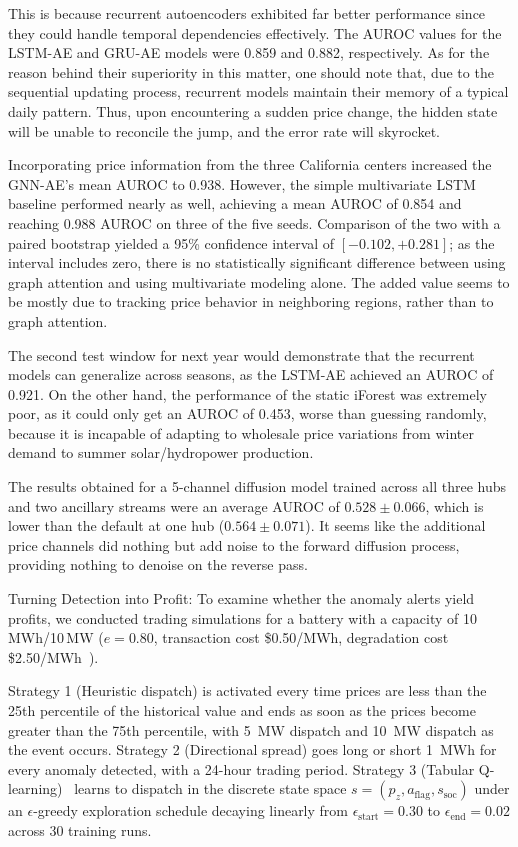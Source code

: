 \documentclass[journal]{IEEEtran}
\begin{document}
This is because recurrent autoencoders exhibited far better performance since they could handle temporal dependencies effectively. The AUROC values for the LSTM-AE and GRU-AE models were 0.859 and 0.882, respectively. As for the reason behind their superiority in this matter, one should note that, due to the sequential updating process, recurrent models maintain their memory of a typical daily pattern. Thus, upon encountering a sudden price change, the hidden state will be unable to reconcile the jump, and the error rate will skyrocket.

Incorporating price information from the three California centers increased the GNN-AE's mean AUROC to 0.938. However, the simple multivariate LSTM baseline performed nearly as well, achieving a mean AUROC of 0.854 and reaching 0.988 AUROC on three of the five seeds. Comparison of the two with a paired bootstrap yielded a 95\% confidence interval of $[-0.102, +0.281]$; as the interval includes zero, there is no statistically significant difference between using graph attention and using multivariate modeling alone. The added value seems to be mostly due to tracking price behavior in neighboring regions, rather than to graph attention.

The second test window for next year would demonstrate that the recurrent models can generalize across seasons, as the LSTM-AE achieved an AUROC of 0.921. On the other hand, the performance of the static iForest was extremely poor, as it could only get an AUROC of 0.453, worse than guessing randomly, because it is incapable of adapting to wholesale price variations from winter demand to summer solar/hydropower production.

The results obtained for a 5-channel diffusion model trained across all three hubs and two ancillary streams were an average AUROC of $0.528\pm0.066$, which is lower than the default at one hub ($0.564\pm0.071$). It seems like the additional price channels did nothing but add noise to the forward diffusion process, providing nothing to denoise on the reverse pass.

Turning Detection into Profit: To examine whether the anomaly alerts yield profits, we conducted trading simulations for a battery with a capacity of 10\,MWh/10\,MW ($e=0.80$, transaction cost \$0.50/MWh, degradation cost \$2.50/MWh~\cite{Xu_BESS_Degradation}).

Strategy 1 (Heuristic dispatch) is activated every time prices are less than the 25th percentile of the historical value and ends as soon as the prices become greater than the 75th percentile, with 5\, MW dispatch and 10\, MW dispatch as the event occurs. Strategy 2 (Directional spread) goes long or short 1\, MWh for every anomaly detected, with a 24-hour trading period. Strategy 3 (Tabular Q-learning)~\cite{Sutton_RL} learns to dispatch in the discrete state space $s=(p_z, a_{\text{flag}}, s_{\text{soc}})$ under an $\epsilon$-greedy exploration schedule decaying linearly from $\epsilon_{\text{start}}=0.30$ to $\epsilon_{\text{end}}=0.02$ across 30 training runs.
\end{document}
